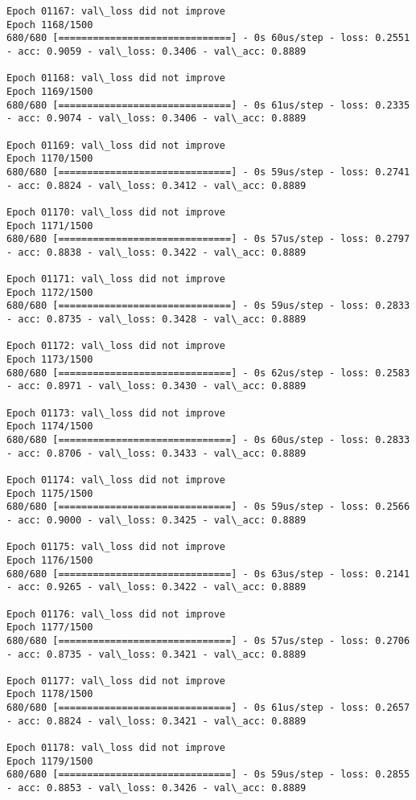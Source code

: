 \documentclass[11pt]{article}
\begin{document}
\begin{Verbatim}[commandchars=\\\{\}]
Epoch 01167: val\_loss did not improve
Epoch 1168/1500
680/680 [==============================] - 0s 60us/step - loss: 0.2551 - acc: 0.9059 - val\_loss: 0.3406 - val\_acc: 0.8889

Epoch 01168: val\_loss did not improve
Epoch 1169/1500
680/680 [==============================] - 0s 61us/step - loss: 0.2335 - acc: 0.9074 - val\_loss: 0.3406 - val\_acc: 0.8889

Epoch 01169: val\_loss did not improve
Epoch 1170/1500
680/680 [==============================] - 0s 59us/step - loss: 0.2741 - acc: 0.8824 - val\_loss: 0.3412 - val\_acc: 0.8889

Epoch 01170: val\_loss did not improve
Epoch 1171/1500
680/680 [==============================] - 0s 57us/step - loss: 0.2797 - acc: 0.8838 - val\_loss: 0.3422 - val\_acc: 0.8889

Epoch 01171: val\_loss did not improve
Epoch 1172/1500
680/680 [==============================] - 0s 59us/step - loss: 0.2833 - acc: 0.8735 - val\_loss: 0.3428 - val\_acc: 0.8889

Epoch 01172: val\_loss did not improve
Epoch 1173/1500
680/680 [==============================] - 0s 62us/step - loss: 0.2583 - acc: 0.8971 - val\_loss: 0.3430 - val\_acc: 0.8889

Epoch 01173: val\_loss did not improve
Epoch 1174/1500
680/680 [==============================] - 0s 60us/step - loss: 0.2833 - acc: 0.8706 - val\_loss: 0.3433 - val\_acc: 0.8889

Epoch 01174: val\_loss did not improve
Epoch 1175/1500
680/680 [==============================] - 0s 59us/step - loss: 0.2566 - acc: 0.9000 - val\_loss: 0.3425 - val\_acc: 0.8889

Epoch 01175: val\_loss did not improve
Epoch 1176/1500
680/680 [==============================] - 0s 63us/step - loss: 0.2141 - acc: 0.9265 - val\_loss: 0.3422 - val\_acc: 0.8889

Epoch 01176: val\_loss did not improve
Epoch 1177/1500
680/680 [==============================] - 0s 57us/step - loss: 0.2706 - acc: 0.8735 - val\_loss: 0.3421 - val\_acc: 0.8889

Epoch 01177: val\_loss did not improve
Epoch 1178/1500
680/680 [==============================] - 0s 61us/step - loss: 0.2657 - acc: 0.8824 - val\_loss: 0.3421 - val\_acc: 0.8889

Epoch 01178: val\_loss did not improve
Epoch 1179/1500
680/680 [==============================] - 0s 59us/step - loss: 0.2855 - acc: 0.8853 - val\_loss: 0.3426 - val\_acc: 0.8889


\end{Verbatim}
\end{document}
